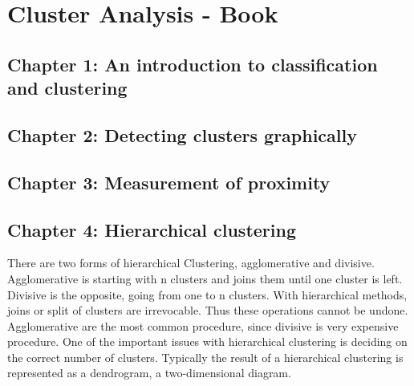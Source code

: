 \documentclass[a4paper,10pt]{article}
\begin{document}
\section{Cluster Analysis - Book}

\subsection{Chapter 1: An introduction to classification and clustering}

\subsection{Chapter 2: Detecting clusters graphically}

\subsection{Chapter 3: Measurement of proximity}

\subsection{Chapter 4: Hierarchical clustering}
There are two forms of hierarchical Clustering, agglomerative and divisive. Agglomerative is starting with n clusters and joins them until one cluster is left. Divisive is the opposite, going from one to n clusters.
With hierarchical methods, joins or split of clusters are irrevocable. Thus these operations cannot be undone.
Agglomerative are the most common procedure, since divisive is very expensive procedure.
One of the important issues with hierarchical clustering is deciding on the correct number of clusters. Typically the result of a hierarchical clustering is represented as a dendrogram, a two-dimensional diagram.
\end{document}
